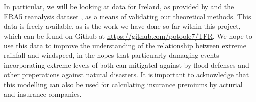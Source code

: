 \documentclass[a4paper]{article}
\begin{document}
\noindent In particular, we will be looking at data for Ireland, as provided by \citet{metHistoricalData} and the ERA5 reanalysis dataset \citep{Hersbach2020}, as a means of validating our theoretical methods. 
This data is freely available, as is the work we have done so far within this project, which can be found on Github at  \url{https://github.com/potoole7/TFR}.
We hope to use this data to improve the understanding of the relationship between extreme rainfall and windspeed, in the hopes that particularly damaging events incorporating extreme levels of both can mitigated against by flood defenses and other preperations against natural disasters. 
It is important to acknowledge that this modelling can also be used for calculating insurance premiums by acturial and insurance companies. 


\newpage

\end{document}
